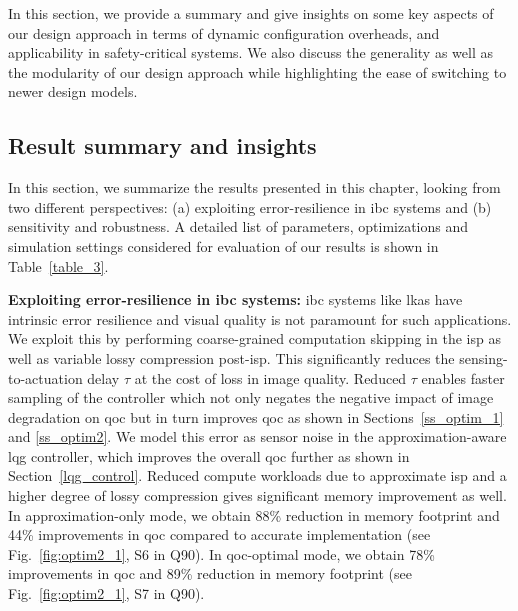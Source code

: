 In this section, we provide a summary and give insights on some key aspects of our design approach in terms of dynamic configuration overheads, and applicability in safety-critical systems. {We also discuss the generality as well as the modularity of our design approach while highlighting the ease of switching to newer design models.} 

\subsection{Result summary and insights}
In this section, we summarize the results presented in this chapter, looking from two different perspectives: (a) exploiting error-resilience in \gls{ibc} systems and (b) sensitivity and robustness. A detailed list of parameters, optimizations and simulation settings considered for evaluation of our results is shown in Table~\ref{table_3}.  
\par \noindent \textbf{Exploiting error-resilience in \gls{ibc} systems:} \gls{ibc} systems like \gls{lkas} have intrinsic error resilience and visual quality is not paramount for such applications. We exploit this by performing coarse-grained computation skipping in the \gls{isp} as well as variable lossy compression post-\gls{isp}. This significantly reduces the sensing-to-actuation delay $\tau$ at the cost of loss in image quality. Reduced $\tau$ enables faster sampling of the controller which not only negates the negative impact of image degradation on \gls{qoc} but in turn improves \gls{qoc} as shown in Sections~\ref{ss_optim_1} and \ref{ss_optim2}. We model this error as sensor noise in the approximation-aware \gls{lqg} controller, which improves the overall \gls{qoc} further as shown in Section~\ref{lqg_control}. Reduced compute workloads due to approximate \gls{isp} and a higher degree of lossy compression gives significant memory improvement as well. 
In approximation-only mode, we obtain 88\% reduction in memory footprint and 44\% improvements in \gls{qoc} compared to accurate implementation (see Fig.~\ref{fig:optim2_1}, S6 in Q90). In \gls{qoc}-optimal mode, we obtain 78\% improvements in \gls{qoc} and 89\% reduction in memory footprint (see Fig.~\ref{fig:optim2_1}, S7 in Q90). 

